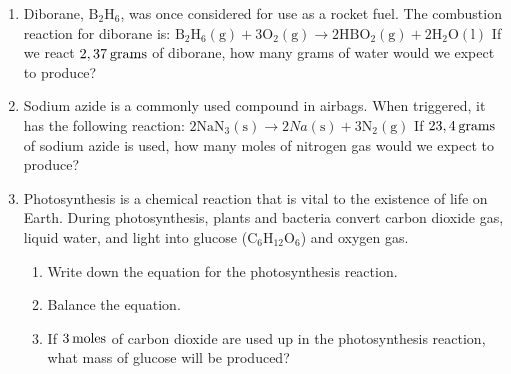       \label{m38712*id285393}\begin{enumerate}[noitemsep, label=\textbf{\arabic*}. ] 
            \label{m38712*uid101}\item Diborane, \begin{math}\mathrm{B}{}_{2}\mathrm{H}{}_{6}\end{math}, was once considered for use as a rocket fuel. The combustion reaction for diborane is:
\begin{math}{\mathrm{B}}_{2}{\mathrm{H}}_{6}\left(\mathrm{g}\right)+3{\mathrm{O}}_{2}\left(\mathrm{g}\right)\to 2\mathrm{H}\mathrm{B}{\mathrm{O}}_{2}\left(\mathrm{g}\right)+2{\mathrm{H}}_{2}\mathrm{O}\left(\mathrm{l}\right)\end{math}
If we react \begin{math}2,37\phantom{\rule{2pt}{0ex}}\mathrm{grams}\end{math} of diborane, how many grams of water would we expect to produce?\newline
            
\label{m38712*uid102}\item Sodium azide is a commonly used compound in airbags. When triggered, it has the following reaction:
\begin{math}2{\mathrm{NaN}}_{3}\left(\mathrm{s}\right)\to 2Na\left(\mathrm{s}\right)+3{\mathrm{N}}_{2}\left(\mathrm{g}\right)\end{math}
If \begin{math}23,4\phantom{\rule{2pt}{0ex}}\mathrm{grams}\end{math} of sodium azide is used, how many moles of nitrogen gas would we expect to produce?\newline
            
\label{m38712*uid103}\item Photosynthesis is a chemical reaction that is vital to the existence of life on Earth. During photosynthesis, plants and bacteria convert carbon dioxide gas, liquid water, and light into glucose (\begin{math}\mathrm{C}{}_{6}\mathrm{H}{}_{12}\mathrm{O}{}_{6}\end{math}) and oxygen gas.
\label{m38712*id285674}\begin{enumerate}[noitemsep, label=\textbf{\alph*}. ] 
            \label{m38712*uid104}\item Write down the equation for the photosynthesis reaction.
\label{m38712*uid105}\item Balance the equation.
\label{m38712*uid106}\item If \begin{math}3\phantom{\rule{2pt}{0ex}}\mathrm{moles}\end{math} of carbon dioxide are used up in the photosynthesis reaction, what mass of glucose will be produced?
\end{enumerate}
                \end{enumerate}
        

